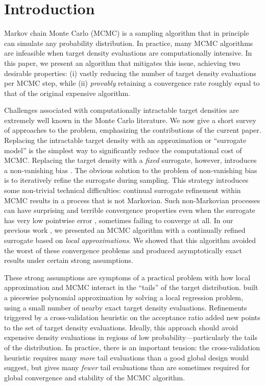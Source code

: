 \section{Introduction}
\label{sec:intro}

Markov chain Monte Carlo (MCMC) is a sampling algorithm that {in principle} can simulate any probability distribution. {In practice,} many MCMC algorithms are infeasible when target density evaluations are computationally intensive. In this paper, we present an algorithm that mitigates this issue, achieving two desirable properties:  (i) vastly reducing the number of target density evaluations per MCMC step, while (ii) \textit{provably} retaining a convergence rate roughly equal to that of the original expensive algorithm. 

Challenges associated with computationally intractable target densities are extremely well known in the Monte Carlo literature. We now give a short survey of approaches to the problem, emphasizing the contributions of the current paper.
%
Replacing the intractable target density with an approximation or  ``surrogate model'' is the simplest way to significantly reduce the computational cost of MCMC. Replacing the target density with a \textit{fixed} surrogate, however, introduces a non-vanishing bias \citep{MarzoukXiu2009, Cotteretal2010, Bliznyuketal2012, LiMarzouk2014, Cui2016etal, stuart2018posterior}. 
%
The obvious solution to the problem of non-vanishing bias is to iteratively refine the surrogate during sampling. This strategy introduces some non-trivial technical difficulties: continual surrogate refinement within MCMC results in a process that is not Markovian. Such non-Markovian processes can have surprising and terrible convergence properties even when the surrogate has very low pointwise error \citep{LatuszynskiRosenthal2014}, sometimes failing to converge at all. In our previous work \citep{Conradetal2016, Conradetal2018}, we presented an MCMC algorithm with a continually refined surrogate based on \textit{local approximations}. We showed that this algorithm avoided the worst of these convergence problems and produced asymptotically exact results under certain strong assumptions. 

These strong assumptions are symptoms of a practical problem with how local approximation and MCMC interact in the ``tails'' of the target distribution. \citet{Conradetal2016, Conradetal2018} built a piecewise polynomial approximation by solving a local regression problem, using a small number of nearby exact target density evaluations. Refinements triggered by a cross-validation heuristic on the acceptance ratio added new points to the set of target density evaluations. Ideally, this approach should avoid expensive density evaluations in regions of low probability---particularly the tails of the distribution. In practice, there is an important tension: the cross-validation heuristic requires many \textit{more} tail evaluations than a good global design would suggest, but gives many \textit{fewer} tail evaluations than are sometimes required for global convergence and stability of the MCMC algorithm. 

